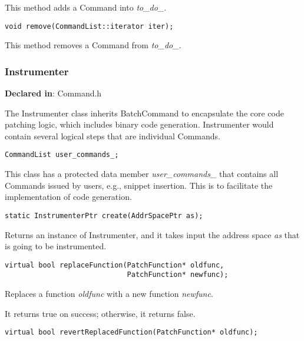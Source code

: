 This method adds a Command into \emph{to\_do\_}.


\begin{verbatim}
void remove(CommandList::iterator iter);

\end{verbatim}



This method removes a Command from \emph{to\_do\_}.

\subsubsection{Instrumenter}
\label{sec-3.2.5}

\textbf{Declared in}: Command.h

The Instrumenter class inherits BatchCommand to encapsulate the core code
patching logic, which includes binary code generation. Instrumenter would
contain several logical steps that are individual Commands.


\begin{verbatim}
CommandList user_commands_;

\end{verbatim}



This class has a protected data member \emph{user\_commands\_} that contains all
Commands issued by users, e.g., snippet insertion. This is to facilitate the
implementation of code generation.


\begin{verbatim}
static InstrumenterPtr create(AddrSpacePtr as);

\end{verbatim}



Returns an instance of Instrumenter, and it takes input the address space \emph{as}
that is going to be instrumented.


\begin{verbatim}
virtual bool replaceFunction(PatchFunction* oldfunc,
                             PatchFunction* newfunc);

\end{verbatim}



Replaces a function \emph{oldfunc} with a new function \emph{newfunc}.

It returns true on success; otherwise, it returns false.


\begin{verbatim}
virtual bool revertReplacedFunction(PatchFunction* oldfunc);

\end{verbatim}



